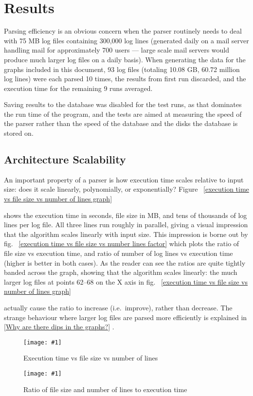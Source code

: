 \documentclass[draft]{svmult}
\newcommand{\showgraph}[3]{%
    \begin{figure}[hbt!]
        \caption{#2}\label{#3}
        \texttt{[image: \#1]}
    \end{figure}
}
\newcommand{\refwithpage}[1]{%
    \empty{}\vref{#1}%
}
\newcommand{\sectionref}[1]{%
    \textsection{}\vref*{#1}%
}
\newcommand{\numberOFlogFILES}[0]{%
    93%
}
\newcommand{\numberOFlogLINEShuman}[0]{%
    60.72 million%
}
\begin{document}
\section{Results}

Parsing efficiency is an obvious concern when the parser routinely needs to
deal with 75 MB log files containing 300,000 log lines (generated daily on
a mail server handling mail for approximately 700 users --- large scale
mail servers would produce much larger log files on a daily basis).  When
generating the data for the graphs included in this document,
\numberOFlogFILES{} log files (totaling 10.08 GB, \numberOFlogLINEShuman{}
log lines) were each parsed 10 times, the results from first run discarded,
and the execution time for the remaining 9 runs averaged.

Saving results to the database was disabled for the test runs, as that
dominates the run time of the program, and the tests are aimed at measuring
the speed of the parser rather than the speed of the database and the disks
the database is stored on.

\subsection{Architecture Scalability}

An important property of a parser is how execution time scales relative to
input size: does it scale linearly, polynomially, or exponentially?
Figure~\refwithpage{execution time vs file size vs number of lines graph}
shows the execution time in seconds, file size in MB, and tens of thousands
of log lines per log file.  All three lines run roughly in parallel, giving
a visual impression that the algorithm scales linearly with input size.
This impression is borne out by fig.~\refwithpage{execution time vs file
size vs number lines factor} which plots the ratio of file size vs
execution time, and ratio of number of log lines vs execution time (higher
is better in both cases).  As the reader can see the ratios are quite
tightly banded across the graph, showing that the algorithm scales
linearly: the much larger log files at points 62--68 on the X axis in
fig.~\refwithpage{execution time vs file size vs number of lines graph}
actually cause the ratio to increase (i.e.\ improve), rather than decrease.
The strange behaviour where larger log files are parsed more efficiently is
explained in \sectionref{Why are there dips in the graphs?}.
\showgraph{build/plot-normal-filesize-numlines}{Execution time vs file size
vs number of lines}{execution time vs file size vs number of lines graph}
\showgraph{build/plot-normal-filesize-numlines-factor}{Ratio of file size
and number of lines to execution time}{execution time vs file size vs
number lines factor}
\end{document}
